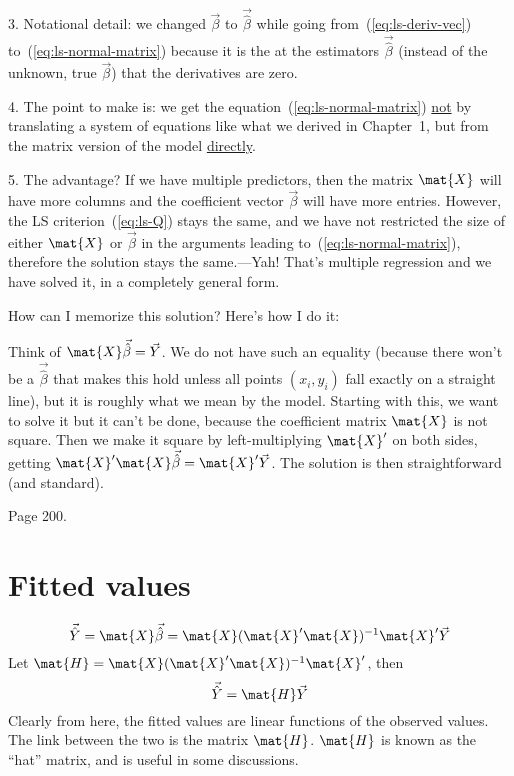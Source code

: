 \documentclass[12pt]{article}
\begin{document}
3. Notational detail:
we changed $\vec{\beta}$ to $\vec{\hat\beta}$
while going from~(\ref{eq:ls-deriv-vec})
to~(\ref{eq:ls-normal-matrix}) because
it is the at the estimators $\vec{\hat\beta}$
(instead of the unknown, true $\vec{\beta}$) that
the derivatives are zero.


4. The point to make is:
we get the equation~(\ref{eq:ls-normal-matrix}) \underline{not} by
translating a system of equations like what we derived in Chapter~1,
but from the matrix version of the model \underline{directly}.

5. The advantage?
If we have multiple predictors,
then the matrix $\mat{X}$ will have more columns and the coefficient
vector $\vec{\beta}$ will have more entries.
However, the LS criterion~(\ref{eq:ls-Q}) stays the same,
and we have not restricted the size of either $\mat{X}$ or $\vec\beta$
in the arguments leading to~(\ref{eq:ls-normal-matrix}),
therefore the solution stays the same.---Yah! That's multiple regression
and we have solved it, in a completely general form.

\alert[Tip]%
How can I memorize this solution?
Here's how I do it:

Think of $\mat{X}\vec{\hat\beta} = \vec{Y}$.
We do not have such an equality (because there won't be a
$\vec{\hat\beta}$ that
makes this hold unless all points $(x_i, y_i)$ fall exactly on a
straight line), but it is roughly what we mean by the model.
Starting with this,
we want to solve it but it can't be done, because the coefficient matrix
$\mat{X}$ is not square.
Then we make it square by left-multiplying $\mat{X}'$ on both sides,
getting $\mat{X}'\mat{X} \vec{\hat\beta} = \mat{X}'\vec{Y}$.
The solution is then straightforward (and standard).

\example Page 200.


\section{Fitted values}

\begin{equation}\label{eq:fitted-full}
\vec{\hat{Y}} = \mat{X}\vec{\hat\beta} =
\mat{X}(\mat{X}'\mat{X})^{-1}\mat{X}'\vec{Y}
\end{equation}
Let $\mat{H} = \mat{X}(\mat{X}'\mat{X})^{-1}\mat{X}'$, then
\begin{equation}\label{eq:fitted-H}
\vec{\hat{Y}} = \mat{H}\vec{Y}
\end{equation}
Clearly from here,
the fitted values are linear functions of the observed values.
The link between the two is the matrix $\mat{H}$.
$\mat{H}$ is known as the ``hat'' matrix, and is useful in some
discussions.
\end{document}
